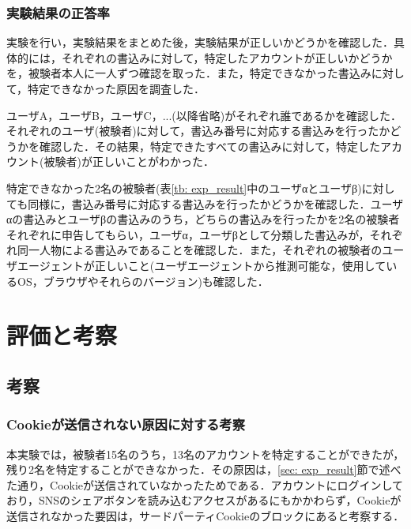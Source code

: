 \documentclass[10pt, a4paper]{jreport}
\begin{document}
\subsection{実験結果の正答率}
実験を行い，実験結果をまとめた後，実験結果が正しいかどうかを確認した．具体的には，それぞれの書込みに対して，特定したアカウントが正しいかどうかを，被験者本人に一人ずつ確認を取った．また，特定できなかった書込みに対して，特定できなかった原因を調査した．

ユーザA，ユーザB，ユーザC，...(以降省略)がそれぞれ誰であるかを確認した．それぞれのユーザ(被験者)に対して，書込み番号に対応する書込みを行ったかどうかを確認した．その結果，特定できたすべての書込みに対して，特定したアカウント(被験者)が正しいことがわかった．

特定できなかった2名の被験者(表\ref{tb: exp_result}中のユーザαとユーザβ)に対しても同様に，書込み番号に対応する書込みを行ったかどうかを確認した．ユーザαの書込みとユーザβの書込みのうち，どちらの書込みを行ったかを2名の被験者それぞれに申告してもらい，ユーザα，ユーザβとして分類した書込みが，それぞれ同一人物による書込みであることを確認した．また，それぞれの被験者のユーザエージェントが正しいこと(ユーザエージェントから推測可能な，使用しているOS，ブラウザやそれらのバージョン)も確認した．












\chapter{評価と考察}

\section{考察}
\subsection{Cookieが送信されない原因に対する考察}
本実験では，被験者15名のうち，13名のアカウントを特定することができたが，残り2名を特定することができなかった．その原因は，\ref{sec: exp_result}節で述べた通り，Cookieが送信されていなかったためである．アカウントにログインしており，SNSのシェアボタンを読み込むアクセスがあるにもかかわらず，Cookieが送信されなかった要因は，サードパーティCookieのブロックにあると考察する．
\end{document}

